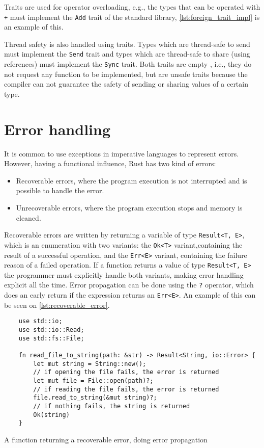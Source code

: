 Traits are used for operator overloading, e.g., the types that can be operated with \texttt{+} must implement the \texttt{Add} trait of the standard library, \ref{lst:foreign_trait_impl} is an example of this. 

Thread safety is also handled using traits. Types which are thread-safe to send must implement the \texttt{Send} trait and types which are thread-safe to share (using references) must implement the \texttt{Sync} trait. Both traits are empty , i.e., they do not request any function to be implemented, but are unsafe traits because the compiler can not guarantee the safety of sending or sharing values of a certain type.

\section{Error handling}
It is common to use exceptions in imperative languages to represent errors. However, having a functional influence, Rust has two kind of errors: 
\begin{itemize}
    \item Recoverable errors, where the program execution is not interrupted and is possible to handle the error.
    \item Unrecoverable errors, where the program execution stops and memory is cleaned.
\end{itemize}

Recoverable errors are written by returning a variable of type \texttt{Result<T, E>}, which is an enumeration with two variants: the \texttt{Ok<T>} variant,containing the result of a successful operation, and the \texttt{Err<E>} variant, containing the failure reason of a failed operation. If a function returns a value of type \texttt{Result<T, E>} the programmer must explicitly handle both variants, making error handling explicit all the time. Error propagation can be done using the \texttt{?} operator, which does an early return if the expression returns an \texttt{Err<E>}. An example of this can be seen on \ref{lst:recoverable_error}.

\begin{listing}[ht]
	\begin{verbatim}
    use std::io;
    use std::io::Read;
    use std::fs::File;

    fn read_file_to_string(path: &str) -> Result<String, io::Error> {
        let mut string = String::new();
        // if opening the file fails, the error is returned
        let mut file = File::open(path)?;
        // if reading the file fails, the error is returned
        file.read_to_string(&mut string)?;
        // if nothing fails, the string is returned
        Ok(string)
    }
    \end{verbatim}
  \caption{A function returning a recoverable error, doing error propagation}
  \label{lst:recoverable_error}
\end{listing}

